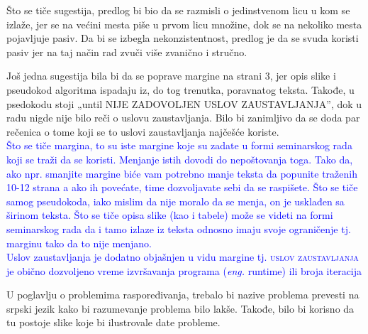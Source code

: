\documentclass[a4paper]{report}
\newcommand{\odgovor}[1]{\textcolor{blue}{#1}}
\newcommand{\eng}[1]{(\textit{eng.} #1)}
\begin{document}
Što se tiče sugestija, predlog bi bio da se razmisli o jedinstvenom licu u kom se izlaže, jer se na većini mesta piše u prvom licu množine, dok se na nekoliko mesta pojavljuje pasiv. Da bi se izbegla nekonzistentnost, predlog je da se svuda koristi pasiv jer na taj način rad zvuči više zvanično i stručno. 

Još jedna sugestija bila bi da se poprave margine na strani 3, jer opis slike i pseudokod algoritma ispadaju iz, do tog trenutka, poravnatog teksta. Takođe, u psedokodu stoji „until NIJE ZADOVOLJEN USLOV ZAUSTAVLJANJA”, dok u radu nigde nije bilo reči o uslovu zaustavljanja. Bilo bi zanimljivo da se doda par rečenica o tome koji se to uslovi zaustavljanja najčešće koriste.\\
\odgovor{Što se tiče margina, to su iste margine koje su zadate u formi seminarskog rada koji se traži da se koristi. Menjanje istih dovodi do nepoštovanja toga. Tako da, ako npr. smanjite margine biće vam potrebno manje teksta da popunite traženih 10-12 strana a ako ih povećate, time dozvoljavate sebi da se raspišete. 
Što se tiče samog pseudokoda, iako mislim da nije moralo da se menja, on je usklađen sa širinom teksta. Što se tiče opisa slike (kao i tabele) može se videti na formi seminarskog rada da i tamo izlaze iz teksta odnosno imaju svoje ograničenje tj. marginu tako da to nije menjano.\\
Uslov zaustavljanja je dodatno objašnjen u vidu margine tj. \textsc{uslov zaustavljanja} je obično dozvoljeno vreme izvršavanja programa \eng{runtime} ili broja iteracija\\}

U poglavlju o problemima raspoređivanja, trebalo bi nazive problema prevesti na srpski jezik kako bi razumevanje problema bilo lakše. Takođe, bilo bi korisno da tu postoje slike koje bi ilustrovale date probleme.
\end{document}
